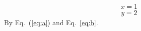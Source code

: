 \documentclass{article}
\begin{document}
\begin{equation} x=1 \label{eq:a}\end{equation}
\begin{align} y=2 \label{eq:b}\end{align}
By Eq.~(\ref{eq:a}) and Eq.~\ref{eq:b}.
\end{document}
